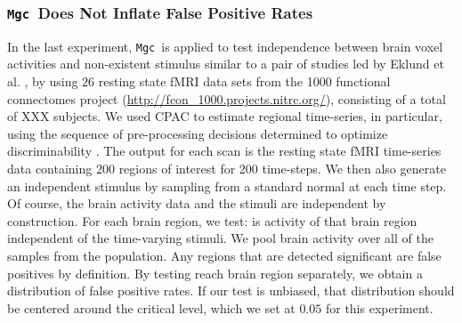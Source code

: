 \documentclass[11pt]{article}
\newcommand{\note}[2][]{\added[#1,remark={#2}]{}}
\providecommand{\sct}[1]{{\sc \texttt{#1}}}
\newcommand{\Migraine}{\sct{Migraine}}
\newcommand{\mtg}{\sct{m2g}}
\newcommand{\Mgc}{\sct{Mgc}}
\newcommand{\Hhg}{\sct{Hhg}}
\newcommand{\Mantel}{\sct{Mantel}}
\newcommand{\cs}[1]{{\note{cs: #1}}}
\begin{document}


\subsubsection*{\Mgc~Does Not Inflate False Positive Rates} %

In the last experiment, \Mgc~is applied to test independence between brain voxel activities and non-existent stimulus similar to a pair of studies led by Eklund et al. \cite{EklundKnutsson2012,Eklund2015}, by using $26$ resting state fMRI data sets from the 1000 functional connectomes project (\url{http://fcon_1000.projects.nitrc.org/}), consisting of a total of XXX subjects.
\cs{please fix} 
We used CPAC \cite{CPAC2015} to estimate regional time-series, in particular, using the sequence of pre-processing decisions determined to optimize discriminability \cite{Wang2016}.  The output for each scan is the resting state fMRI time-series data containing $200$ regions of interest for $200$ time-steps.
We then also generate an independent stimulus  by sampling from a standard normal at each time step.  Of course, the brain activity data and the stimuli are independent by construction.
For each brain region, we test: is activity of that  brain region independent of the time-varying stimuli. We pool brain activity over all of the samples from the population.
Any regions that are detected significant are false positives by definition.  By testing reach brain region separately, we obtain a distribution of false positive rates.  If our test is unbiased, that distribution should be centered around the critical level, which we set at $0.05$ for this experiment.
\end{document}
